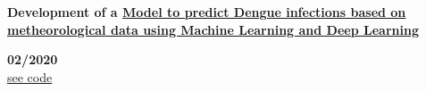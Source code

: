\begin{minipage}{0.8\textwidth}
    \parbox{0.8\linewidth}{\textbf{Development of a \hyperref[sec:dengue]{Model to predict Dengue infections based on metheorological data using Machine Learning and Deep Learning}}} \hfill \textbf{02/2020}\\
    \href{https://github.com/JavierOramas/DengAI}{see code}\\
    \end{minipage} \hfill {}\\\\
    